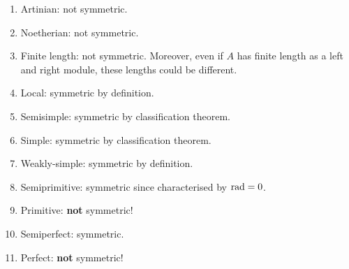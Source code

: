 \documentclass[12pt]{article}
\begin{document}
\begin{enumerate}[label=(\alph*)]
	\item Artinian: not symmetric.
	\item Noetherian: not symmetric.
	\item Finite length: not symmetric. \newline
	Moreover, even if $A$ has finite length as a left and right module, these lengths could be different.
	\item Local: symmetric by definition.
	\item Semisimple: symmetric by classification theorem. 
	\item Simple: symmetric by classification theorem. 
	\item Weakly-simple: symmetric by definition.
	\item Semiprimitive: symmetric since characterised by $\operatorname{rad} = 0$.
	\item Primitive: \textbf{not} symmetric! 
	\item Semiperfect: symmetric.
	\item Perfect: \textbf{not} symmetric! 
\end{enumerate}
\end{document}

